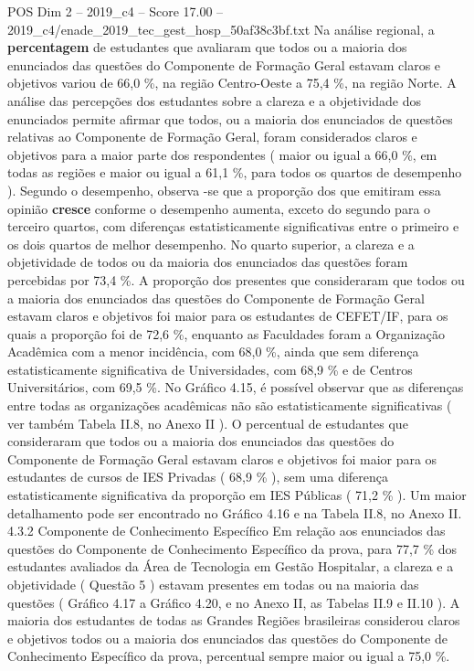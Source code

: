 \begin{textsample}{POS Dim 2 – 2019\_c4 – Score 17.00 – 2019\_c4/enade\_2019\_tec\_gest\_hosp\_50af38c3bf.txt}
Na análise regional, a \textbf{percentagem} de estudantes que avaliaram que todos ou a maioria dos enunciados das questões do Componente de Formação Geral estavam claros e objetivos variou de 66,0 \%, na região Centro-Oeste a 75,4 \%, na região Norte.
A análise das percepções dos estudantes sobre a clareza e a objetividade dos enunciados permite afirmar que todos, ou a maioria dos enunciados de questões relativas ao Componente de Formação Geral, foram considerados claros e objetivos para a maior parte dos respondentes ( maior ou igual a 66,0 \%, em todas as regiões e maior ou igual a 61,1 \%, para todos os quartos de desempenho ).
Segundo o desempenho, observa -se que a proporção dos que emitiram essa opinião \textbf{cresce} conforme o desempenho aumenta, exceto do segundo para o terceiro quartos, com diferenças estatisticamente significativas entre o primeiro e os dois quartos de melhor desempenho.
No quarto superior, a clareza e a objetividade de todos ou da maioria dos enunciados das questões foram percebidas por 73,4 \%.
A proporção dos presentes que consideraram que todos ou a maioria dos enunciados das questões do Componente de Formação Geral estavam claros e objetivos foi maior para os estudantes de CEFET/IF, para os quais a proporção foi de 72,6 \%, enquanto as Faculdades foram a Organização Acadêmica com a menor incidência, com 68,0 \%, ainda que sem diferença estatisticamente significativa de Universidades, com 68,9 \% e de Centros Universitários, com 69,5 \%.
No Gráfico 4.15, é possível observar que as diferenças entre todas as organizações acadêmicas não são estatisticamente significativas ( ver também Tabela II.8, no Anexo II ).
O percentual de estudantes que consideraram que todos ou a maioria dos enunciados das questões do Componente de Formação Geral estavam claros e objetivos foi maior para os estudantes de cursos de IES Privadas ( 68,9 \% ), sem uma diferença estatisticamente significativa da proporção em IES Públicas ( 71,2 \% ).
Um maior detalhamento pode ser encontrado no Gráfico 4.16 e na Tabela II.8, no Anexo II. 4.3.2 Componente de Conhecimento Específico Em relação aos enunciados das questões do Componente de Conhecimento Específico da prova, para 77,7 \% dos estudantes avaliados da Área de Tecnologia em Gestão Hospitalar, a clareza e a objetividade ( Questão 5 ) estavam presentes em todas ou na maioria das questões ( Gráfico 4.17 a Gráfico 4.20, e no Anexo II, as Tabelas II.9 e II.10 ).
A maioria dos estudantes de todas as Grandes Regiões brasileiras considerou claros e objetivos todos ou a maioria dos enunciados das questões do Componente de Conhecimento Específico da prova, percentual sempre maior ou igual a 75,0 \%.

\end{textsample}
